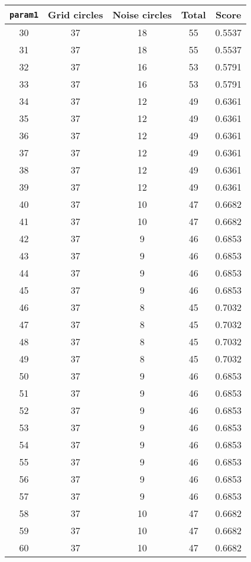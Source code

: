 \documentclass[letterpaper, 12pt]{article}
\begin{document}
\begin{longtable}{|c|c|c|c|c|}
\hline
\textbf{\texttt{param1}} & \textbf{Grid circles} & \textbf{Noise circles} & \textbf{Total} & \textbf{Score} \\
\hline
30 & 37 & 18 & 55 & 0.5537 \\
\hline
31 & 37 & 18 & 55 & 0.5537 \\
\hline
32 & 37 & 16 & 53 & 0.5791 \\
\hline
33 & 37 & 16 & 53 & 0.5791 \\
\hline
34 & 37 & 12 & 49 & 0.6361 \\
\hline
35 & 37 & 12 & 49 & 0.6361 \\
\hline
36 & 37 & 12 & 49 & 0.6361 \\
\hline
37 & 37 & 12 & 49 & 0.6361 \\
\hline
38 & 37 & 12 & 49 & 0.6361 \\
\hline
39 & 37 & 12 & 49 & 0.6361 \\
\hline
40 & 37 & 10 & 47 & 0.6682 \\
\hline
41 & 37 & 10 & 47 & 0.6682 \\
\hline
42 & 37 & 9 & 46 & 0.6853 \\
\hline
43 & 37 & 9 & 46 & 0.6853 \\
\hline
44 & 37 & 9 & 46 & 0.6853 \\
\hline
45 & 37 & 9 & 46 & 0.6853 \\
\hline
46 & 37 & 8 & 45 & 0.7032 \\
\hline
47 & 37 & 8 & 45 & 0.7032 \\
\hline
48 & 37 & 8 & 45 & 0.7032 \\
\hline
49 & 37 & 8 & 45 & 0.7032 \\
\hline
50 & 37 & 9 & 46 & 0.6853 \\
\hline
51 & 37 & 9 & 46 & 0.6853 \\
\hline
52 & 37 & 9 & 46 & 0.6853 \\
\hline
53 & 37 & 9 & 46 & 0.6853 \\
\hline
54 & 37 & 9 & 46 & 0.6853 \\
\hline
55 & 37 & 9 & 46 & 0.6853 \\
\hline
56 & 37 & 9 & 46 & 0.6853 \\
\hline
57 & 37 & 9 & 46 & 0.6853 \\
\hline
58 & 37 & 10 & 47 & 0.6682 \\
\hline
59 & 37 & 10 & 47 & 0.6682 \\
\hline
60 & 37 & 10 & 47 & 0.6682 \\

\end{longtable}
\end{document}
